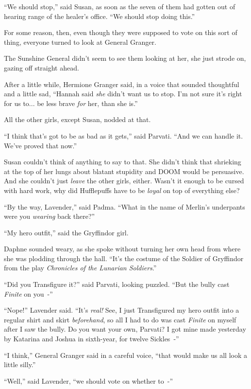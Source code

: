 ``We should stop,'' said Susan, as soon as the seven of them had gotten out of hearing range of the healer's office. ``We should stop doing this.''

For some reason, then, even though they were supposed to vote on this sort of thing, everyone turned to look at General Granger.

The Sunshine General didn't seem to see them looking at her, she just strode on, gazing off straight ahead.

After a little while, Hermione Granger said, in a voice that sounded thoughtful and a little sad, ``Hannah said \emph{she} didn't want us to stop. I'm not sure it's right for us to... be less brave \emph{for} her, than she is.''

All the other girls, except Susan, nodded at that.

``I think that's got to be as bad as it gets,'' said Parvati. ``And we can handle it. We've proved that now.''

Susan couldn't think of anything to say to that. She didn't think that shrieking at the top of her lungs about blatant stupidity and DOOM would be persuasive. And she couldn't just \emph{leave} the other girls, either. Wasn't it enough to be cursed with hard work, why did Hufflepuffs have to be \emph{loyal} on top of everything else?

``By the way, Lavender,'' said Padma. ``What in the name of Merlin's underpants were you \emph{wearing} back there?''

``My hero outfit,'' said the Gryffindor girl.

Daphne sounded weary, as she spoke without turning her own head from where she was plodding through the hall. ``It's the costume of the Soldier of Gryffindor from the play \emph{Chronicles of the Lunarian Soldiers}.''

``Did you Transfigure it?'' said Parvati, looking puzzled. ``But the bully cast \emph{Finite} on you~-''

``Nope!'' Lavender said. ``It's \emph{real!} See, I just Transfigured my hero outfit into a regular shirt and skirt \emph{beforehand}, so all I had to do was cast \emph{Finite} on myself after I saw the bully. Do you want your own, Parvati? I got mine made yesterday by Katarina and Joshua in sixth-year, for twelve Sickles~-''

``I think,'' General Granger said in a careful voice, ``that would make us all look a little silly.''

``Well,'' said Lavender, ``we should vote on whether to~-''

